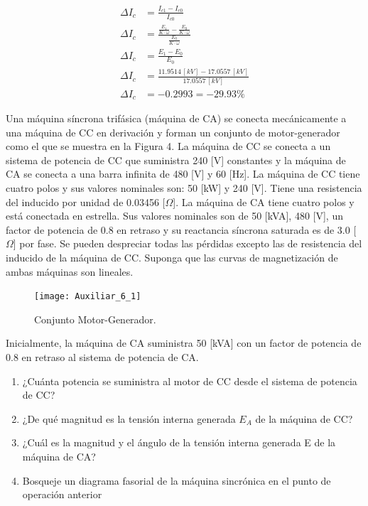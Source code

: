 \documentclass[
  11pt,
  letterpaper,
   addpoints,
   answers
  ]{exam}
\begin{document}
\begin{questions}
\begin{solution}
\begin{align}
\Delta I_c &= \frac{I_{c1} - I_{c0}}{I_{c0}} \\
\Delta I_c &= \frac{\frac{E_1}{K \cdot \omega} - \frac{E_0}{K \cdot \omega}}{\frac{E_0}{K \cdot \omega}} \\
\Delta I_c &= \frac{E_1 - E_0}{E_0} \\
\Delta I_c &= \frac{11.9514 \, [kV] - 17.0557 \, [kV]}{17.0557 \, [kV]} \\
\Delta I_c &= -0.2993 = -29.93 \%
\end{align}

 \end{solution}
\question Una máquina síncrona trifásica (máquina de CA) se conecta mecánicamente a una máquina de CC en derivación y forman un conjunto de motor-generador como el que se muestra en la Figura 4. La máquina de CC se conecta a un sistema de potencia de CC que suministra 240 [V] constantes y la máquina de CA se conecta a una barra infinita de 480 [V] y 60 [Hz]. La máquina de CC tiene cuatro polos y sus valores nominales son: 50 [kW] y 240 [V]. Tiene una resistencia del inducido por unidad de 0.03456 [$\Omega$]. La máquina de CA tiene cuatro polos y está conectada en estrella. Sus valores nominales son de 50 [kVA], 480 [V], un factor de potencia de 0.8 en retraso y su reactancia síncrona saturada es de 3.0 [$\Omega$] por fase. Se pueden despreciar todas las pérdidas excepto las de resistencia del inducido de la máquina de CC. Suponga que las curvas de magnetización de ambas máquinas son lineales.

\begin{figure}[h!]
    \centering
    \texttt{[image: Auxiliar\_6\_1]}
    \caption{Conjunto Motor-Generador.}
\end{figure}

Inicialmente, la máquina de CA suministra 50 [kVA] con un factor de potencia de 0.8 en retraso al sistema de potencia de CA.
\begin{enumerate}
    \item ¿Cuánta potencia se suministra al motor de CC desde el sistema de potencia de CC?
    \item ¿De qué magnitud es la tensión interna generada $E_A$ de la máquina de CC?
    \item ¿Cuál es la magnitud y el ángulo de la tensión interna generada E de la máquina de
    CA?
    \item Bosqueje un diagrama fasorial de la máquina sincrónica en el punto de operación anterior
\end{enumerate}
\begin{solution}

\end{solution}
\end{questions}
\end{document}
